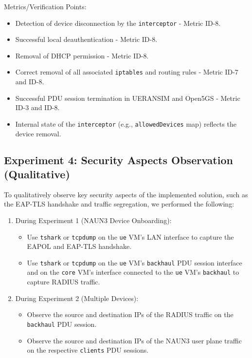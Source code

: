 Metrics/Verification Points:
\begin{itemize}
    \item Detection of device disconnection by the \texttt{interceptor} - Metric ID-8.
    \item Successful local deauthentication - Metric ID-8.
    \item Removal of \ac{DHCP} permission - Metric ID-8.
    \item Correct removal of all associated \texttt{iptables} and routing rules - Metric ID-7 and ID-8.
    \item Successful \ac{PDU} session termination in UERANSIM and Open5GS - Metric ID-3 and ID-8.
    \item Internal state of the \texttt{interceptor} (e.g., \texttt{allowedDevices} map) reflects the device removal.
\end{itemize}

\subsection{Experiment 4: Security Aspects Observation (Qualitative)}

To qualitatively observe key security aspects of the implemented solution, such as the \ac{EAP-TLS} handshake and traffic segregation, we performed the following:

\begin{enumerate}
    \item{
        During Experiment 1 (\ac{NAUN3} Device Onboarding):
        \begin{itemize}
            \item Use \texttt{tshark} or \texttt{tcpdump} on the \texttt{ue} \ac{VM}'s \ac{LAN} interface to capture the \ac{EAPOL} and \ac{EAP-TLS} handshake.

            \item Use \texttt{tshark} or \texttt{tcpdump} on the \texttt{ue} \ac{VM}'s \texttt{backhaul} \ac{PDU} session interface and on the \texttt{core} \ac{VM}'s interface connected to the \texttt{ue} \ac{VM}'s \texttt{backhaul} to capture \ac{RADIUS} traffic.
        \end{itemize}
    }
    \item{
        During Experiment 2 (Multiple Devices):
        \begin{itemize}
            \item Observe the source and destination \acp{IP} of the \ac{RADIUS} traffic on the \texttt{backhaul} \ac{PDU} session.
            
            \item Observe the source and destination \acp{IP} of the \ac{NAUN3} user plane traffic on the respective \texttt{clients} \ac{PDU} sessions.
        \end{itemize}
    }
\end{enumerate}


